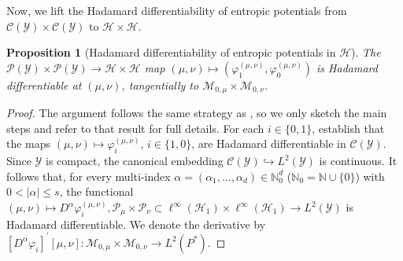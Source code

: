 \documentclass{article}
\theoremstyle{plain}
\newtheorem{proposition}[theorem]{Proposition}
\theoremstyle{definition}
\theoremstyle{remark}
\newcommand{\N}{\mathbb{N}}
\newcommand{\abs}[1]{\left|#1\right|}
\newcommand{\cH}{\mathcal{H}}
\newcommand{\cP}{\mathcal{P}}
\newcommand{\cC}{\mathcal{C}}
\newcommand{\cM}{\mathcal{M}}
\newcommand{\cY}{\mathcal{Y}}
\newcommand{\1}{\mathbbm{1}}
\theoremstyle{plain}
\theoremstyle{definition}
\begin{document}
    Now, we lift the Hadamard differentiability of entropic potentials from $\cC(\cY) \times \cC(\cY)$ to $\cH \times \cH$.
    \begin{proposition}[Hadamard differentiability of entropic potentials in $\cH$]\label{lem:EOT_potential_derivative_H}
         The $\cP(\cY) \times \cP(\cY) \to \cH \times \cH$ map $(\mu, \nu) \mapsto (\varphi_1^{(\mu, \nu)}, \varphi_0^{(\mu, \nu)})$ is Hadamard differentiable at $(\mu, \nu)$, tangentially to $\cM_{0, \mu} \times \cM_{0, \nu}$.
    \end{proposition}
    \begin{proof}

    The argument follows the same strategy as \citet[Thm.~3]{goldfeld2024limit}, so we only sketch the main steps and refer to that result for full details. For each $i \in \{0,1\}$, \citet[Lem.~4]{goldfeld2024limit} establish that the maps $(\mu, \nu) \mapsto \varphi_i^{(\mu, \nu)}$, $i \in \{1,0\}$, are Hadamard differentiable in $\cC(\cY)$. Since $\cY$ is compact, the canonical embedding $\cC(\cY) \hookrightarrow L^2(\cY)$ is continuous. It follows that, for every multi-index $\alpha = (\alpha_1, \dots, \alpha_d) \in \N_0^d$ ($\N_0 = \N \cup \{0\}$) with $0<\abs{\alpha} \leq s$, the functional $(\mu, \nu) \mapsto D^\alpha \varphi_i^{(\mu, \nu)}, \cP_{\mu} \times \cP_{\nu} \subset \ell^\infty(\cH_1) \times  \ell^\infty(\cH_1) \to L^2(\cY)$ is Hadamard differentiable. We denote the derivative by $[D^\alpha \varphi_i]^\prime[\mu, \nu]: \cM_{0, \mu} \times \cM_{0, \nu} \to L^2(P^*)$.  
    

\end{proof}
\end{document}
